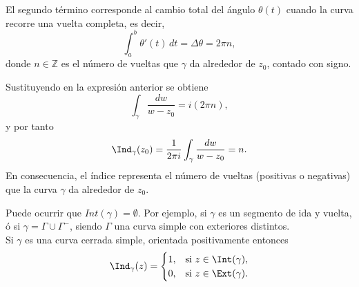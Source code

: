 El segundo término corresponde al cambio total del ángulo $\theta(t)$ cuando la curva recorre una vuelta completa, es decir,
\[
    \int_a^b \theta'(t)\,dt = \Delta \theta = 2\pi n,
\]
donde $n \in \mathbb{Z}$ es el número de vueltas que $\gamma$ da alrededor de $z_0$, contado con signo.

Sustituyendo en la expresión anterior se obtiene
\[
    \int_\gamma \frac{dw}{w - z_0} = i(2\pi n),
\]
y por tanto
\[
    \Ind_\gamma(z_0) = \frac{1}{2\pi i} \int_\gamma \frac{dw}{w - z_0} = n.
\]
En consecuencia, el índice representa el número de vueltas (positivas o negativas) que la curva $\gamma$ da alrededor de $z_0$.


\begin{observación}
    Puede ocurrir que $Int(\gamma) = \emptyset$. Por ejemplo, si $\gamma$ es un segmento de ida y vuelta, ó si $\gamma = \Gamma \cup \Gamma^-$, siendo $\Gamma$ una curva simple con exteriores distintos.\\
    Si $\gamma$ es una curva cerrada simple, orientada positivamente entonces
    \[
        \Ind_\gamma (z) = \begin{cases}
            1, & \text{si } z \in \Int(\gamma), \\
            0, & \text{si } z \in \Ext(\gamma).
        \end{cases}
    \]
\end{observación}



